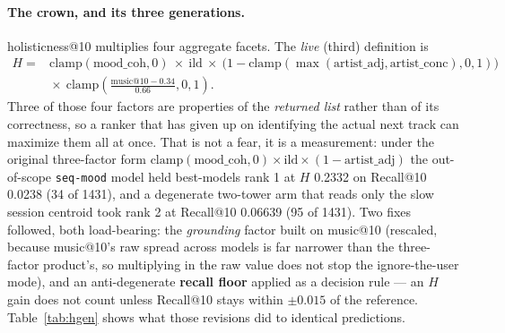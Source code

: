 \documentclass[11pt]{article}
\begin{document}
\paragraph{The crown, and its three generations.} holisticness@10 multiplies
four aggregate facets. The \emph{live} (third) definition is
\[
  \begin{aligned}
    H = {}& \mathrm{clamp}(\text{mood\_coh},0)\ \times\ \text{ild}
      \ \times\ \bigl(1-\mathrm{clamp}(\max(\text{artist\_adj},\text{artist\_conc}),0,1)\bigr)\\
      &{}\times\ \mathrm{clamp}\!\left(\frac{\text{music@10}-\num{0.34}}{\num{0.66}},0,1\right).
  \end{aligned}
\]
Three of those four factors are properties of the \emph{returned list} rather
than of its correctness, so a ranker that has given up on identifying the actual
next track can maximize them all at once. That is not a fear, it is a
measurement: under the original three-factor form
$\mathrm{clamp}(\text{mood\_coh},0)\times\text{ild}\times(1-\text{artist\_adj})$
the out-of-scope \texttt{seq-mood} model held best-models rank 1 at $H$
\num{0.2332} on Recall@10 \num{0.0238} (\num{34} of \num{1431}), and a
degenerate two-tower arm that reads only the slow session centroid took rank 2
at Recall@10 \num{0.06639} (\num{95} of \num{1431}). Two fixes followed, both
load-bearing: the \emph{grounding} factor built on music@10 (rescaled, because
music@10's raw spread across models is far narrower than the three-factor
product's, so multiplying in the raw value does not stop the ignore-the-user
mode), and an anti-degenerate \textbf{recall floor} applied as a decision rule
--- an $H$ gain does not count unless Recall@10 stays within $\pm\num{0.015}$ of
the reference. Table~\ref{tab:hgen} shows what those revisions did to identical
predictions.
\end{document}
